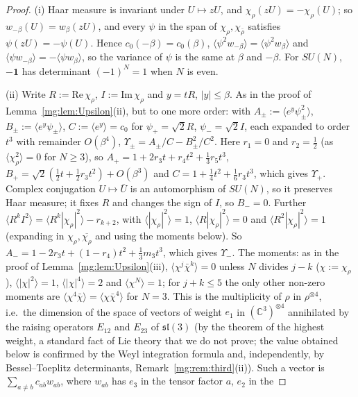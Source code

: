 \documentclass[11pt,a4paper]{article}
\theoremstyle{definition}
\theoremstyle{remark}
\newcommand{\C}{\mathbb{C}}
\begin{document}
\begin{proof}
(i) Haar measure is invariant under $U\mapsto zU$, and $\chi_\rho(zU)=-\chi_\rho(U)$; so $w_{-\beta}(U)=w_\beta(zU)$, and every $\psi$ in the span of
$\chi_\rho,\chi_{\bar\rho}$ satisfies $\psi(zU)=-\psi(U)$. Hence $c_0(-\beta)=c_0(\beta)$, $\langle\psi^2w_{-\beta}\rangle=\langle\psi^2w_\beta\rangle$ and
$\langle\psi w_{-\beta}\rangle=-\langle\psi w_\beta\rangle$, so the variance of $\psi$ is the same at $\beta$ and $-\beta$. For $SU(N)$, $-\mathbf1$ has determinant
$(-1)^N=1$ when $N$ is even.

(ii) Write $R:=\mathrm{Re}\,\chi_\rho$, $I:=\mathrm{Im}\,\chi_\rho$ and $y=tR$, $|y|\le\beta$. As in the proof of Lemma~\ref{mg:lem:Upsilon}(ii), but to one
more order: with $A_\pm:=\langle e^y\psi_\pm^2\rangle$, $B_\pm:=\langle e^y\psi_\pm\rangle$, $C:=\langle e^y\rangle=c_0$ for $\psi_+=\sqrt2R$, $\psi_-=\sqrt2I$, each expanded to
order $t^3$ with remainder $O(\beta^4)$, $\Upsilon_\pm=A_\pm/C-B_\pm^2/C^2$. Here $r_1=0$ and $r_2=\frac12$ (as $\langle\chi_\rho^2\rangle=0$ for $N\ge3$), so
$A_+=1+2r_3t+r_4t^2+\frac13r_5t^3$, $B_+=\sqrt2(\frac12t+\frac12r_3t^2)+O(\beta^3)$ and $C=1+\frac14t^2+\frac16r_3t^3$, which gives $\Upsilon_+$. Complex
conjugation $U\mapsto\bar U$ is an automorphism of $SU(N)$, so it preserves Haar measure; it fixes $R$ and changes the sign of $I$, so $B_-=0$. Further
$\langle R^kI^2\rangle=\langle R^k|\chi_\rho|^2\rangle-r_{k+2}$, with $\langle|\chi_\rho|^2\rangle=1$, $\langle R|\chi_\rho|^2\rangle=0$ and $\langle R^2|\chi_\rho|^2\rangle=1$ (expanding in
$\chi_\rho,\overline{\chi_\rho}$ and using the moments below). So $A_-=1-2r_3t+(1-r_4)t^2+\frac13m_3t^3$, which gives $\Upsilon_-$. The moments: as in the proof of
Lemma~\ref{mg:lem:Upsilon}(iii), $\langle\chi^j\bar\chi^k\rangle=0$ unless $N$ divides $j-k$ ($\chi:=\chi_\rho$), $\langle|\chi|^2\rangle=1$, $\langle|\chi|^4\rangle=2$ and
$\langle\chi^N\rangle=1$; for $j+k\le5$ the only other non-zero moments are $\langle\chi^4\bar\chi\rangle=\langle\chi\bar\chi^4\rangle$ for $N=3$. This is the multiplicity of $\rho$
in $\rho^{\otimes4}$, i.e.\ the dimension of the space of vectors of weight $e_1$ in $(\C^3)^{\otimes4}$ annihilated by the raising operators $E_{12}$ and $E_{23}$ of
$\mathfrak{sl}(3)$ (by the theorem of the highest weight, a standard fact of Lie theory that we do not prove; the value obtained below is confirmed
by the Weyl integration formula and, independently, by Bessel--Toeplitz determinants, Remark~\ref{mg:rem:third}(ii)). Such a vector is $\sum_{a\ne b}c_{ab}w_{ab}$, where $w_{ab}$ has $e_3$ in the tensor factor $a$, $e_2$ in the

\end{proof}
\end{document}
